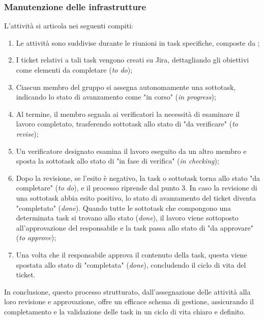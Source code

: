\subsubsection{Manutenzione delle infrastrutture}
L'attività si articola nei seguenti compiti:
            \begin{enumerate}
                
            \item Le attività sono suddivise durante le riunioni in task specifiche, composte da ;
            \item I ticket relativi a tali task vengono creati su Jira, dettagliando gli obiettivi come elementi da completare (\textit{to do});
            \item Ciascun membro del gruppo si assegna autonomamente una sottotask, indicando lo stato di avanzamento come "in corso" (\textit{in progress});
            \item Al termine, il membro segnala ai verificatori la necessità di esaminare il lavoro completato, trasferendo sottotask allo stato di "da verificare" (\textit{to revise});
            \item Un verificatore designato esamina il lavoro eseguito da un altro membro e sposta la sottotask allo stato di "in fase di verifica" (\textit{in checking});
            \item Dopo la revisione, se l'esito è negativo, la task o sottotask torna allo stato "da completare" (\textit{to do}), e il processo riprende dal punto 3. In caso la revisione di una sottotask abbia esito positivo, lo stato di avanzamento del ticket diventa "completato" (\textit{done}). Quando tutte le sottotask che compongono una determinata task si trovano allo stato (\textit{done}), il lavoro viene sottoposto all'approvazione del responsabile e la task passa allo stato di "da approvare" (\textit{to approve});
            \item Una volta che il responsabile approva il contenuto della task, questa viene spostata allo stato di "completata" (\textit{done}), concludendo il ciclo di vita del ticket.
            \end{enumerate}
In conclusione, questo processo strutturato, dall'assegnazione delle attività alla loro revisione e approvazione, offre un efficace schema di gestione, assicurando il completamento e la validazione delle task in un ciclo di vita chiaro e definito.

